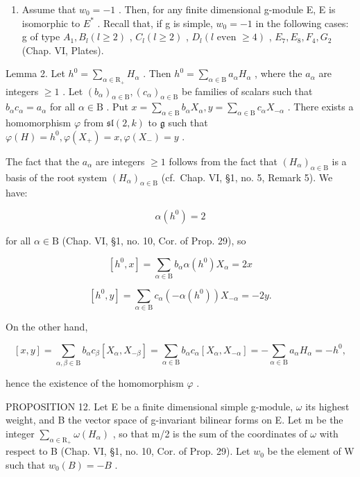 \begin{enumerate}
\def\labelenumi{\arabic{enumi})}
\setcounter{enumi}{1}
\tightlist
\item
  Assume that \(w_{0} = -1\) . Then, for any finite dimensional g-module E, E is isomorphic to \(E^{*}\) . Recall that, if g is simple, \(w_{0} = -1\) in the following cases: g of type \(A_{1}, B_{l} (l \geq 2)\) , \(C_{l} (l \geq 2)\) , \(D_{l} (l \text{ even } \geq 4)\) , \(E_{7}, E_{8}, F_{4}, G_{2}\) (Chap. VI, Plates).
\end{enumerate}

Lemma 2. Let \(h^0 = \sum_{\alpha \in \mathrm{R}_{+}} H_\alpha\) . Then \(h^0 = \sum_{\alpha \in \mathrm{B}} a_\alpha H_\alpha\) , where the \(a_\alpha\) are integers \(\geq 1\) . Let \((b_\alpha)_{\alpha \in \mathrm{B}}, (c_\alpha)_{\alpha \in \mathrm{B}}\) be families of scalars such that \(b_\alpha c_\alpha = a_\alpha\) for all \(\alpha \in \mathrm{B}\) . Put \(x = \sum_{\alpha \in \mathrm{B}} b_\alpha X_\alpha, y = \sum_{\alpha \in \mathrm{B}} c_\alpha X_{-\alpha}\) . There exists a homomorphism \(\varphi\) from \(\mathfrak{sl}(2,k)\) to \(\mathfrak{g}\) such that \(\varphi(H) = h^0, \varphi(X_+) = x, \varphi(X_-) = y\) .

The fact that the \(a_{\alpha}\) are integers \(\geq 1\) follows from the fact that \((H_{\alpha})_{\alpha \in \mathrm{B}}\) is a basis of the root system \((H_{\alpha})_{\alpha \in \mathrm{B}}\) (cf.~Chap. VI, §1, no. 5, Remark 5). We have:

\[
\alpha (h ^ {0}) = 2\tag{1}
\]

for all \(\alpha \in \mathrm{B}\) (Chap. VI, §1, no. 10, Cor. of Prop. 29), so

\[
[ h ^ {0}, x ] = \sum_ {\alpha \in \mathrm{B}} b _ {\alpha} \alpha (h ^ {0}) X _ {\alpha} = 2 x\tag{2}
\]

\[
[ h ^ {0}, y ] = \sum_ {\alpha \in \mathrm{B}} c _ {\alpha} (- \alpha (h ^ {0})) X _ {- \alpha} = - 2 y.\tag{3}
\]

On the other hand,

\[
[ x, y ] = \sum_ {\alpha , \beta \in \mathrm{B}} b _ {\alpha} c _ {\beta} [ X _ {\alpha}, X _ {- \beta} ] = \sum_ {\alpha \in \mathrm{B}} b _ {\alpha} c _ {\alpha} [ X _ {\alpha}, X _ {- \alpha} ] = - \sum_ {\alpha \in \mathrm{B}} a _ {\alpha} H _ {\alpha} = - h ^ {0},\tag{4}
\]

hence the existence of the homomorphism \(\varphi\) .

PROPOSITION 12. Let E be a finite dimensional simple g-module, \(\omega\) its highest weight, and B the vector space of g-invariant bilinear forms on E. Let m be the integer \(\sum_{\alpha\in\mathrm{R}_{+}}\omega(H_{\alpha})\) , so that m/2 is the sum of the coordinates of \(\omega\) with respect to B (Chap. VI, §1, no. 10, Cor. of Prop. 29). Let \(w_{0}\) be the element of W such that \(w_{0}(B) = -B\) .


